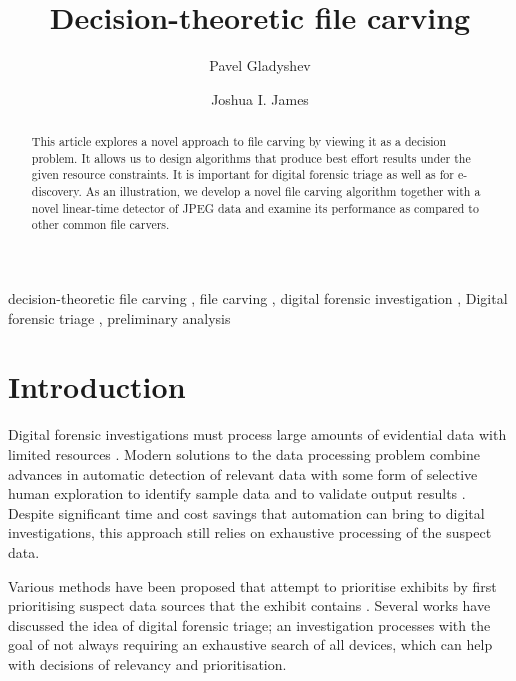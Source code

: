\documentclass[final,5p,times,twocolumn,authoryear]{elsarticle}
\begin{document}
\begin{frontmatter}

\title{Decision-theoretic file carving}

\author[add1]{Pavel Gladyshev}
\author[add2]{Joshua I. James}
\address[add1]{Digital Forensics Investigation Research Laboratory, University College Dublin, Belfield, Dublin 4, Ireland}
\address[add2]{Digital Forensics Investigation Research Laboratory, Hallym University, 1 Hallimdaehak-gil, Chuncheon-si, Gangwon-do, South Korea}
\begin{abstract}
This article explores a novel approach to file carving by viewing it as a decision problem. It allows us to design algorithms that produce best effort results under the given resource constraints. It is important for digital forensic triage as well as for e-discovery. As an illustration, we develop a novel file carving algorithm together with a novel linear-time detector of JPEG data and examine its performance as compared to other common file carvers.
\end{abstract}

\begin{keyword}
decision-theoretic file carving \sep 
file carving \sep 
digital forensic investigation \sep 
Digital forensic triage \sep
preliminary analysis
\end{keyword}
\end{frontmatter}

\section{Introduction}

Digital forensic investigations must process large amounts of evidential data with limited resources \citep{Casey2009, pollitt2013triage}. Modern solutions to the data processing problem combine advances in automatic detection of relevant data with some form of selective human exploration to identify sample data and to validate output results \citep{marturana2013machine, schell2007cyber, james2014measuring}. Despite significant time and cost savings that automation can bring to digital investigations, this approach still relies on exhaustive processing of the suspect data.

Various methods have been proposed that attempt to prioritise exhibits by first prioritising suspect data sources that the exhibit contains \citep{shaw2013practical, rogers2003role, overill2013triage}. Several works \citep{Koopmans2013,Casey2009} have discussed the idea of digital forensic triage; an investigation processes with the goal of not always requiring an exhaustive search of all devices, which can help with decisions of relevancy and prioritisation.
\end{document}
